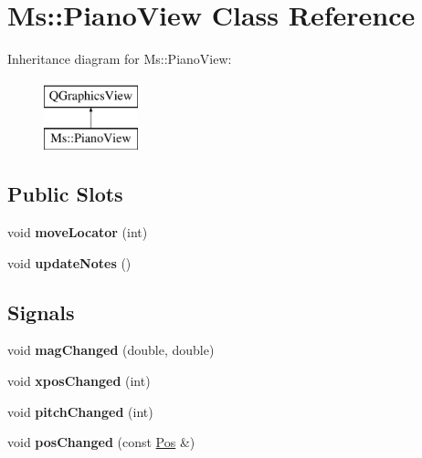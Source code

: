 \hypertarget{class_ms_1_1_piano_view}{}\section{Ms\+:\+:Piano\+View Class Reference}
\label{class_ms_1_1_piano_view}
Inheritance diagram for Ms\+:\+:Piano\+View\+:\begin{figure}[H]
\begin{center}
\leavevmode
\includegraphics[height=2.000000cm]{class_ms_1_1_piano_view}
\end{center}
\end{figure}
\subsection*{Public Slots}
\begin{DoxyCompactItemize}
\item 
\mbox{\label{class_ms_1_1_piano_view_a0ce575cef325626084a4531842323921}} 
void {\bfseries move\+Locator} (int)
\item 
\mbox{\label{class_ms_1_1_piano_view_a7c4efbe35a3b8c6b72e8abf285e60fae}} 
void {\bfseries update\+Notes} ()
\end{DoxyCompactItemize}
\subsection*{Signals}
\begin{DoxyCompactItemize}
\item 
\mbox{\label{class_ms_1_1_piano_view_a24eb19c67265e86a45c83ac49adca517}} 
void {\bfseries mag\+Changed} (double, double)
\item 
\mbox{\label{class_ms_1_1_piano_view_a43b12383f77fd3151fb7f054dad1d066}} 
void {\bfseries xpos\+Changed} (int)
\item 
\mbox{\label{class_ms_1_1_piano_view_a226b78ac531b886c7a41c8950754c2c2}} 
void {\bfseries pitch\+Changed} (int)
\item 
\mbox{\label{class_ms_1_1_piano_view_af86caad7529ec0dd5ece80297aeff635}} 
void {\bfseries pos\+Changed} (const \hyperlink{class_ms_1_1_pos}{Pos} \&)
\end{DoxyCompactItemize}
